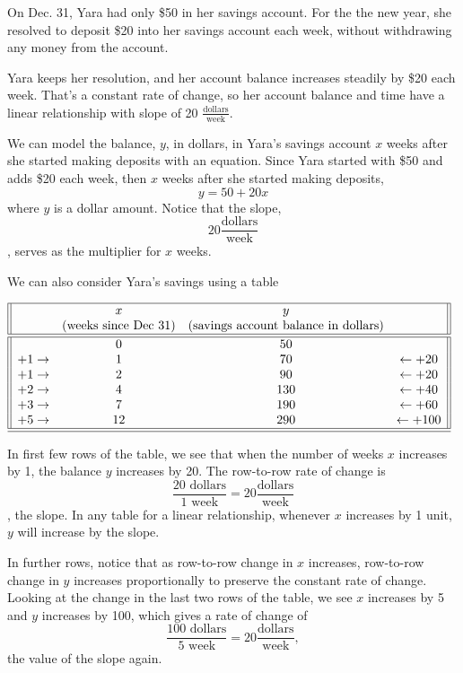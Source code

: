 \documentclass[nooutcomes]{ximera}
\begin{document}
\begin{example}
On Dec. 31, Yara had only \$50 in her savings account. For the the new year, she resolved to deposit \$20 into her savings account each week, without withdrawing any money from the account. 

Yara keeps her resolution, and her account balance increases steadily by \$20 each week. That's a constant rate of change, so her account balance and time have a linear relationship with slope of 20 $\frac{\text{dollars}}{\text{week}}$.  

\begin{explanation}

We can model the balance, $y$,  in dollars, in Yara's savings account $x$  weeks after she started making deposits with an equation. Since Yara started with \$50  and adds \$20  each week, then $x$  weeks after she started making deposits, $$y=50+20x$$ where $y$  is a dollar amount. Notice that the slope, $$20 \frac{\text{dollars}}{\text{week}}$$,  serves as the multiplier for $x$ weeks.

We can also consider Yara's savings using a table

\begin{center}
\(
\begin{array}{||cccc||}
\hline
&x &y&\\
&\text{(weeks since Dec 31)}&\text{(savings account balance in dollars)}&\\
\hline 
\hline
&0&50&\\
+1\rightarrow&1&70&\leftarrow +20\\
+1\rightarrow&2&90&\leftarrow +20\\
+2\rightarrow&4&130&\leftarrow +40\\
+3\rightarrow&7&190&\leftarrow +60\\
+5\rightarrow&12&290&\leftarrow +100\\
\hline 
\hline
\end{array}
\)
\end{center}



In first few rows of the table, we see that when the number of weeks $x$ increases by 1, the balance $y$  increases by 20.   The row-to-row rate of change is $$\frac{\text{20 dollars}}{\text{1 week}} = 20 \frac{\text{dollars}}{\text{week}}$$ ,  the slope. In any table for a linear relationship, whenever $x$  increases by 1  unit, $y$  will increase by the slope.

In further rows, notice that as row-to-row change in $x$ increases, row-to-row change in $y$  increases proportionally to preserve the constant rate of change. Looking at the change in the last two rows of the table, we see $x$  increases by 5  and $y$  increases by 100,  which gives a rate of change of  $$\frac{\text{100 dollars}}{\text{5 week}} = 20 \frac{\text{dollars}}{\text{week}},$$  the value of the slope again.


\end{explanation}
\end{example}
\end{document}
